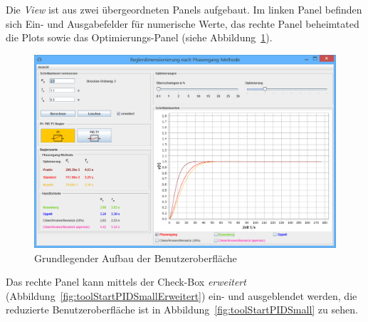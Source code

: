 Die  \emph{View} ist  aus  zwei \"ubergeordneten  Panels aufgebaut. Im  linken
Panel  befinden  sich  Ein-  und Ausgabefelder  f\"ur  numerische  Werte,  das
rechte  Panel  beheimtated  die  Plots  sowie  das  Optimierungs-Panel  (siehe
Abbildung~\ref{fig:toolStartPI}).

\begin{figure}[h!, width=\pagewidth]
    \centering
    \includegraphics[width=\textwidth]{images/toolStartPI.jpg}
    \caption{Grundlegender Aufbau der Benutzeroberfl\"ache}
    \label{fig:toolStartPI}
\end{figure}

Das    rechte   Panel    kann   mittels    der   Check-Box    \emph{erweitert}
(Abbildung~\ref{fig:toolStartPIDSmallErweitert})    ein-   und    ausgeblendet
werden,       die      reduzierte       Benutzeroberfl\"ache      ist       in
Abbildung~\ref{fig:toolStartPIDSmall} zu sehen.

